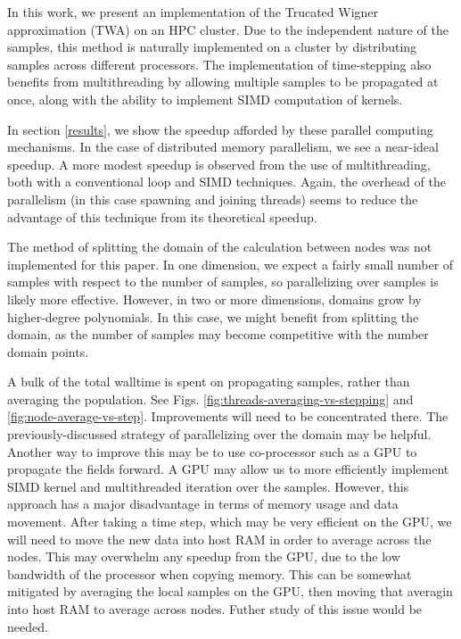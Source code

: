 \documentclass{article}
\begin{document}
In this work, we present an implementation of the Trucated Wigner approximation (TWA) on an HPC cluster.
Due to the independent nature of the samples, this method is naturally implemented on a cluster by 
distributing samples across different processors. The implementation of time-stepping also benefits from 
multithreading by allowing multiple samples to be propagated at once, along with the ability to 
implement SIMD computation of kernels.

In section \ref{results}, we show the speedup afforded by these parallel computing mechanisms. 
In the case of distributed memory parallelism, we see a near-ideal speedup. 
A more modest speedup is observed 
from the use of multithreading, both with a conventional loop and SIMD techniques. Again, the overhead of 
the parallelism (in this case spawning and joining threads) seems to reduce the advantage of this technique
from its theoretical speedup. 

The method of splitting the domain of the calculation between nodes was not implemented for this paper. 
In one dimension, we expect a fairly small number of samples with respect to the number of samples, 
so parallelizing over samples is likely more effective. However, in two or more dimensions, domains grow
by higher-degree polynomials. In this case, we might benefit from splitting the domain, as the number of 
samples may become competitive with the number domain points.

A bulk of the total walltime is spent on propagating samples, rather than averaging the population. See 
Figs. \ref{fig:threads-averaging-vs-stepping} and \ref{fig:node-average-vs-step}. Improvements will need 
to be concentrated there. The previously-discussed strategy of parallelizing over the domain may be helpful.
Another way to improve this may be to use co-processor such as a GPU to propagate the fields forward. 
A GPU may allow us to more efficiently implement SIMD kernel and multithreaded iteration over the samples.
However, this approach has a major disadvantage in terms of memory usage and data movement. 
After taking a time step, which may be very efficient on the GPU, we will need to move the new data
into host RAM in order to average across the nodes. This may overwhelm any speedup from the GPU, 
due to the low bandwidth of the processor when copying memory. This can be somewhat mitigated by 
averaging the local samples on the GPU, then moving that averagin into host RAM to average across nodes. 
Futher study of this issue would be needed.
\end{document}
